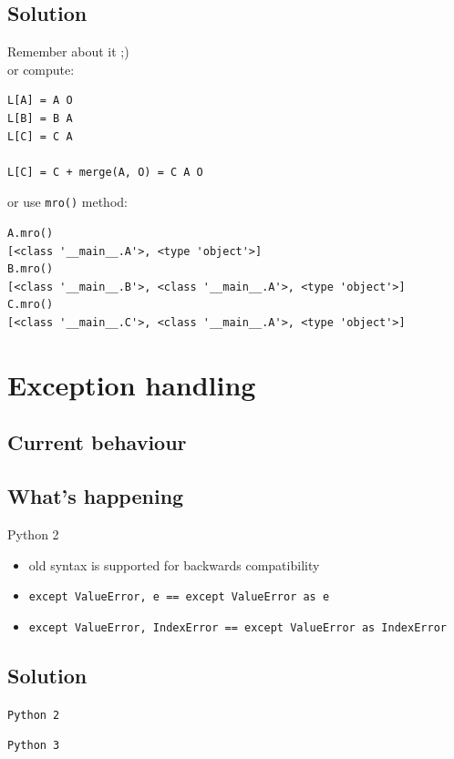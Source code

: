 \documentclass{beamer}
\begin{document}
\subsection{Solution}
\begin{frame}[fragile]
Remember about it ;) \\
\pause
or compute:
\begin{lstlisting}
L[A] = A O
L[B] = B A
L[C] = C A

L[C] = C + merge(A, O) = C A O
\end{lstlisting}
\pause
or use \texttt{mro()} method:
\begin{lstlisting}
A.mro()
[<class '__main__.A'>, <type 'object'>]
B.mro()
[<class '__main__.B'>, <class '__main__.A'>, <type 'object'>]
C.mro()
[<class '__main__.C'>, <class '__main__.A'>, <type 'object'>]
\end{lstlisting}
\end{frame}

\section{Exception handling}
\subsection{Current behaviour}
\begin{frame}
\begin{center}
\structure{\insertsection}
\end{center}

\pause 
\end{frame}

\subsection{What's happening}
\begin{frame}
Python 2
\begin{itemize}
\item old syntax  is supported for backwards compatibility
\item \texttt{except ValueError, e == except ValueError as e}
\item \texttt{except ValueError, IndexError == except ValueError as IndexError}
\end{itemize}
\end{frame}

\subsection{Solution}
\begin{frame}
\texttt{Python 2}

\pause 
\pause \texttt{Python 3}

\end{frame}
\end{document}

